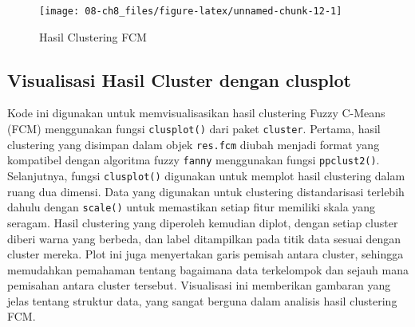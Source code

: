 \documentclass[
  oneside]{book}
\newenvironment{Shaded}{\begin{snugshade}}{\end{snugshade}}
\newcommand{\AttributeTok}[1]{\textcolor[rgb]{0.13,0.29,0.53}{#1}}
\newcommand{\ConstantTok}[1]{\textcolor[rgb]{0.56,0.35,0.01}{#1}}
\newcommand{\DecValTok}[1]{\textcolor[rgb]{0.00,0.00,0.81}{#1}}
\newcommand{\FunctionTok}[1]{\textcolor[rgb]{0.13,0.29,0.53}{\textbf{#1}}}
\newcommand{\NormalTok}[1]{#1}
\newcommand{\OtherTok}[1]{\textcolor[rgb]{0.56,0.35,0.01}{#1}}
\newcommand{\SpecialCharTok}[1]{\textcolor[rgb]{0.81,0.36,0.00}{\textbf{#1}}}
\newcommand{\StringTok}[1]{\textcolor[rgb]{0.31,0.60,0.02}{#1}}
\begin{document}
\begin{figure}[h]

{\centering \texttt{[image: 08-ch8\_files/figure-latex/unnamed-chunk-12-1]} 

}

\caption{Hasil Clustering FCM}\label{fig:unnamed-chunk-12}
\end{figure}

\subsection*{Visualisasi Hasil Cluster dengan clusplot}\label{visualisasi-hasil-cluster-dengan-clusplot}

Kode ini digunakan untuk memvisualisasikan hasil clustering Fuzzy C-Means (FCM) menggunakan fungsi \texttt{clusplot()} dari paket \texttt{cluster}. Pertama, hasil clustering yang disimpan dalam objek \texttt{res.fcm} diubah menjadi format yang kompatibel dengan algoritma fuzzy \texttt{fanny} menggunakan fungsi \texttt{ppclust2()}. Selanjutnya, fungsi \texttt{clusplot()} digunakan untuk memplot hasil clustering dalam ruang dua dimensi. Data yang digunakan untuk clustering distandarisasi terlebih dahulu dengan \texttt{scale()} untuk memastikan setiap fitur memiliki skala yang seragam. Hasil clustering yang diperoleh kemudian diplot, dengan setiap cluster diberi warna yang berbeda, dan label ditampilkan pada titik data sesuai dengan cluster mereka. Plot ini juga menyertakan garis pemisah antara cluster, sehingga memudahkan pemahaman tentang bagaimana data terkelompok dan sejauh mana pemisahan antara cluster tersebut. Visualisasi ini memberikan gambaran yang jelas tentang struktur data, yang sangat berguna dalam analisis hasil clustering FCM.

\begin{Shaded}
\end{Shaded}
\end{document}
